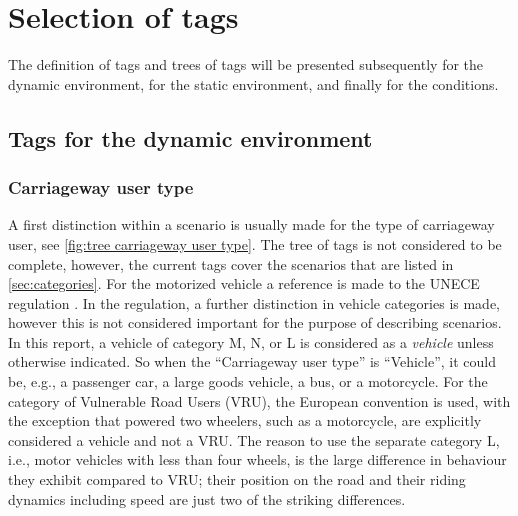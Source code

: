 \section{Selection of tags}
\label{sec:tags}

The definition of tags and trees of tags will be presented subsequently for the dynamic environment, for the static environment, and finally for the conditions.



\subsection{Tags for the dynamic environment}
\label{sec:selection of tags dynamic}

\subsubsection{Carriageway user type}
A first distinction within a scenario is usually made for the type of carriageway user, see \cref{fig:tree carriageway user type}. The tree of tags is not considered to be complete, however, the current tags cover the scenarios that are listed in \cref{sec:categories}. For the motorized vehicle a reference is made to the UNECE regulation \cite{vehicle_categories2011}. In the regulation, a further distinction in vehicle categories is made, however this is not considered important for the purpose of describing scenarios. In this report, a vehicle of category M, N, or L is considered as a \emph{vehicle} unless otherwise indicated. So when the ``Carriageway user type'' is ``Vehicle'', it could be, e.g., a passenger car, a large goods vehicle, a bus, or a motorcycle. For the category of Vulnerable Road Users (VRU), the European convention is used, with the exception that powered two wheelers, such as a motorcycle, are explicitly considered a vehicle and not a VRU. The reason to use the separate category L, i.e., motor vehicles with less than four wheels, is the large difference in behaviour they exhibit compared to VRU; their position on the road and their riding dynamics including speed are just two of the striking differences. 

